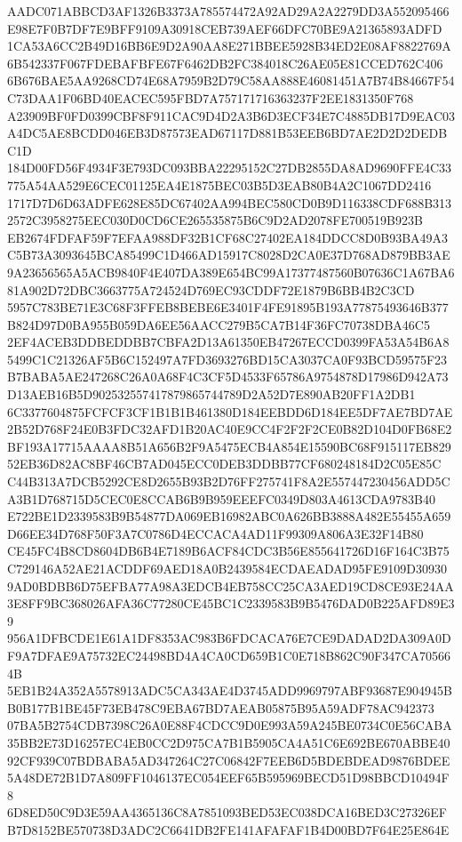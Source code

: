 \documentclass[UTF8,fontset=fandol,zihao=-4,a4paper]{ctexart}
\begin{document}
{{AADC071ABBCD3AF1326B3373A785574472A92AD29A2A2279DD3A552095466E98E7F0B7DF7E9BFF9109A30918CEB739AEF66DFC70BE9A21365893ADFD
1CA53A6CC2B49D16BB6E9D2A90AA8E271BBEE5928B34ED2E08AF8822769A6B542337F067FDEBAFBFE67F6462DB2FC384018C26AE05E81CCED762C406
6B676BAE5AA9268CD74E68A7959B2D79C58AA888E46081451A7B74B84667F54C73DAA1F06BD40EACEC595FBD7A757171716363237F2EE1831350F768
A23909BF0FD0399CBF8F911CAC9D4D2A3B6D3ECF34E7C4885DB17D9EAC03A4DC5AE8BCDD046EB3D87573EAD67117D881B53EEB6BD7AE2D2D2DEDBC1D
184D00FD56F4934F3E793DC093BBA22295152C27DB2855DA8AD9690FFE4C33775A54AA529E6CEC01125EA4E1875BEC03B5D3EAB80B4A2C1067DD2416
1717D7D6D63ADFE628E85DC67402AA994BEC580CD0B9D116338CDF688B3132572C3958275EEC030D0CD6CE265535875B6C9D2AD2078FE700519B923B
EB2674FDFAF59F7EFAA988DF32B1CF68C27402EA184DDCC8D0B93BA49A3C5B73A3093645BCA85499C1D466AD15917C8028D2CA0E37D768AD879BB3AE
9A23656565A5ACB9840F4E407DA389E654BC99A17377487560B07636C1A67BA681A902D72DBC3663775A724524D769EC93CDDF72E1879B6BB4B2C3CD
5957C783BE71E3C68F3FFEB8BEBE6E3401F4FE91895B193A77875493646B377B824D97D0BA955B059DA6EE56AACC279B5CA7B14F36FC70738DBA46C5
2EF4ACEB3DDBEDDBB7CBFA2D13A61350EB47267ECCD0399FA53A54B6A85499C1C21326AF5B6C152497A7FD3693276BD15CA3037CA0F93BCD59575F23
B7BABA5AE247268C26A0A68F4C3CF5D4533F65786A9754878D17986D942A73D13AEB16B5D902532557417879865744789D2A52D7E890AB20FF1A2DB1
6C3377604875FCFCF3CF1B1B1B461380D184EEBDD6D184EE5DF7AE7BD7AE2B52D768F24E0B3FDC32AFD1B20AC40E9CC4F2F2F2CE0B82D104D0FB68E2
BF193A17715AAAA8B51A656B2F9A5475ECB4A854E15590BC68F915117EB82952EB36D82AC8BF46CB7AD045ECC0DEB3DDBB77CF680248184D2C05E85C
C44B313A7DCB5292CE8D2655B93B2D76FF275741F8A2E557447230456ADD5CA3B1D768715D5CEC0E8CCAB6B9B959EEEFC0349D803A4613CDA9783B40
E722BE1D2339583B9B54877DA069EB16982ABC0A626BB3888A482E55455A659D66EE34D768F50F3A7C0786D4ECCACA4AD11F99309A806A3E32F14B80
CE45FC4B8CD8604DB6B4E7189B6ACF84CDC3B56E855641726D16F164C3B75C729146A52AE21ACDDF69AED18A0B2439584ECDAEADAD95FE9109D30930
9AD0BDBB6D75EFBA77A98A3EDCB4EB758CC25CA3AED19CD8CE93E24AA3E8FF9BC368026AFA36C77280CE45BC1C2339583B9B5476DAD0B225AFD89E39
956A1DFBCDE1E61A1DF8353AC983B6FDCACA76E7CE9DADAD2DA309A0DF9A7DFAE9A75732EC24498BD4A4CA0CD659B1C0E718B862C90F347CA705664B
5EB1B24A352A5578913ADC5CA343AE4D3745ADD9969797ABF93687E904945BB0B177B1BE45F73EB478C9EBA67BD7AEAB05875B95A59ADF78AC942373
07BA5B2754CDB7398C26A0E88F4CDCC9D0E993A59A245BE0734C0E56CABA35BB2E73D16257EC4EB0CC2D975CA7B1B5905CA4A51C6E692BE670ABBE40
92CF939C07BDBABA5AD347264C27C06842F7EEB6D5BDEBDEAD9876BDEE5A48DE72B1D7A809FF1046137EC054EEF65B595969BECD51D98BBCD10494F8
6D8ED50C9D3E59AA4365136C8A7851093BED53EC038DCA16BED3C27326EFB7D8152BE570738D3ADC2C6641DB2FE141AFAFAF1B4D00BD7F64E25E864E
}}
\end{document}
